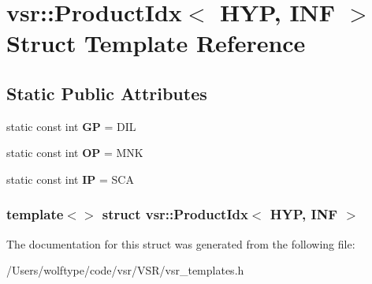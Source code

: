 \hypertarget{structvsr_1_1_product_idx_3_01_h_y_p_00_01_i_n_f_01_4}{\section{vsr\-:\-:Product\-Idx$<$ H\-Y\-P, I\-N\-F $>$ Struct Template Reference}
\label{structvsr_1_1_product_idx_3_01_h_y_p_00_01_i_n_f_01_4}
}
\subsection*{Static Public Attributes}
\begin{DoxyCompactItemize}
\item 
\hypertarget{structvsr_1_1_product_idx_3_01_h_y_p_00_01_i_n_f_01_4_aee9c4ec493363cedd51efc77dcf26ef3}{static const int {\bfseries G\-P} = D\-I\-L}\label{structvsr_1_1_product_idx_3_01_h_y_p_00_01_i_n_f_01_4_aee9c4ec493363cedd51efc77dcf26ef3}

\item 
\hypertarget{structvsr_1_1_product_idx_3_01_h_y_p_00_01_i_n_f_01_4_a6a5c953ac2bdd7fd78e6b8beb26f4bd2}{static const int {\bfseries O\-P} = M\-N\-K}\label{structvsr_1_1_product_idx_3_01_h_y_p_00_01_i_n_f_01_4_a6a5c953ac2bdd7fd78e6b8beb26f4bd2}

\item 
\hypertarget{structvsr_1_1_product_idx_3_01_h_y_p_00_01_i_n_f_01_4_ac8a53e75c7f4623f6486815c4cbe09c7}{static const int {\bfseries I\-P} = S\-C\-A}\label{structvsr_1_1_product_idx_3_01_h_y_p_00_01_i_n_f_01_4_ac8a53e75c7f4623f6486815c4cbe09c7}

\end{DoxyCompactItemize}
\subsubsection*{template$<$$>$ struct vsr\-::\-Product\-Idx$<$ H\-Y\-P, I\-N\-F $>$}



The documentation for this struct was generated from the following file\-:\begin{DoxyCompactItemize}
\item 
/\-Users/wolftype/code/vsr/\-V\-S\-R/vsr\-\_\-templates.\-h\end{DoxyCompactItemize}
